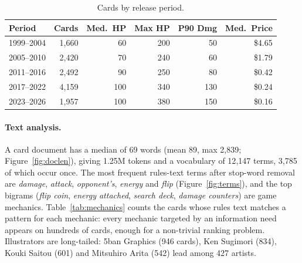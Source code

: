 \documentclass[sigconf]{acmart}
\begin{document}
  \begin{table}[ht]
      \centering
      \caption{Cards by release period.}
      \label{tab:periods}
      \small
      \setlength{\tabcolsep}{4pt}
      \begin{tabular}{lrrrrr}
          \hline
          \textbf{Period} & \textbf{Cards} & \textbf{Med.\ HP} & \textbf{Max HP} & \textbf{P90 Dmg} & \textbf{Med.\ Price} \\
          \hline
          1999--2004 & 1{,}660 & 60 & 200 & 50 & \$4.65 \\
          2005--2010 & 2{,}420 & 70 & 240 & 60 & \$1.79 \\
          2011--2016 & 2{,}492 & 90 & 250 & 80 & \$0.42 \\
          2017--2022 & 4{,}159 & 100 & 340 & 130 & \$0.24 \\
          2023--2026 & 1{,}957 & 100 & 380 & 150 & \$0.16 \\
          \hline
      \end{tabular}
  \end{table}

  \paragraph{Text analysis.}
  A card document has a median of 69 words (mean 89, max 2{,}839;
  Figure~\ref{fig:doclen}), giving 1.25M tokens and a vocabulary of 12{,}147
  terms, 3{,}785 of which occur once. The most frequent rules-text terms
  after stop-word removal are \emph{damage}, \emph{attack}, \emph{opponent's},
  \emph{energy} and \emph{flip} (Figure~\ref{fig:terms}), and the top bigrams
  (\emph{flip coin}, \emph{energy attached}, \emph{search deck},
  \emph{damage counters}) are game mechanics. Table~\ref{tab:mechanics}
  counts the cards whose rules text matches a pattern for each mechanic:
  every mechanic targeted by an information need appears on hundreds of
  cards, enough for a non-trivial ranking problem. Illustrators are
  long-tailed: 5ban Graphics (946 cards), Ken Sugimori (834), Kouki Saitou
  (601) and Mitsuhiro Arita (542) lead among 427 artists.
\end{document}

